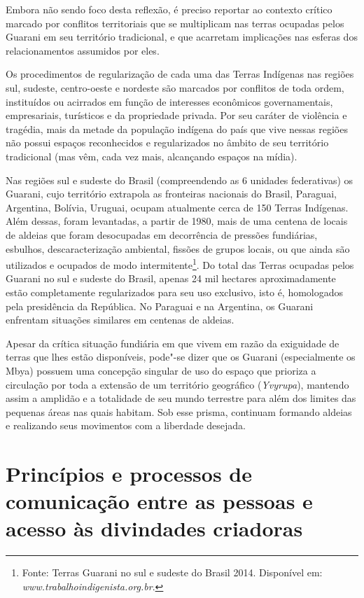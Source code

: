 Embora não sendo foco desta reflexão, é preciso reportar ao contexto
crítico marcado por conflitos territoriais que se multiplicam nas
terras ocupadas pelos Guarani em seu território tradicional, e que
acarretam implicações nas esferas dos relacionamentos assumidos por
eles. 

Os procedimentos de regularização de cada uma das Terras Indígenas nas
regiões sul, sudeste, centro-oeste e nordeste são marcados por conflitos
de toda ordem, instituídos ou acirrados em função de interesses
econômicos governamentais, empresariais, turísticos e da propriedade
privada. Por seu caráter de violência e tragédia, mais da metade da
população indígena do país que vive nessas regiões não possui espaços
reconhecidos e regularizados no âmbito de seu território tradicional
(mas vêm, cada vez mais, alcançando espaços na mídia).

Nas regiões sul e sudeste do Brasil (compreendendo as 6 unidades
federativas) os Guarani, cujo território extrapola as fronteiras
nacionais do Brasil, Paraguai, Argentina, Bolívia, Uruguai, ocupam
atualmente cerca de 150 Terras Indígenas. Além dessas, foram
levantadas, a partir de 1980, mais de uma centena de locais de aldeias
que foram desocupadas em decorrência de pressões fundiárias, esbulhos,
descaracterização ambiental, fissões de grupos locais, ou que ainda são
utilizados e ocupados de modo intermitente\footnote{Fonte: Terras
Guarani no sul e sudeste do Brasil 2014. Disponível em:
\emph{www.trabalhoindigenista.org.br}.}. Do total das
Terras ocupadas pelos Guarani no sul e sudeste do Brasil, apenas 24 mil
hectares aproximadamente estão completamente regularizados para seu uso
exclusivo, isto é, homologados pela presidência da República. No
Paraguai e na Argentina, os Guarani enfrentam situações similares em
centenas de aldeias. 

Apesar da crítica situação fundiária em que vivem em razão da exiguidade
de terras que lhes estão disponíveis, pode"-se dizer que os Guarani
(especialmente os Mbya) possuem uma concepção singular de uso do espaço
que prioriza a circulação por toda a extensão de um território
geográfico (\emph{Yvyrupa}), mantendo assim a amplidão e a totalidade de seu
mundo terrestre para além dos limites das pequenas áreas nas quais
habitam. Sob esse prisma, continuam formando aldeias e realizando seus
movimentos com a liberdade desejada.

\section{Princípios e processos de comunicação entre as pessoas e acesso às
divindades criadoras} 

